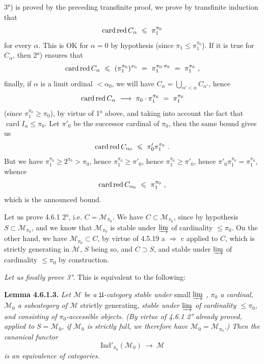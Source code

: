 \documentclass[11pt]{article}
\newcommand{\printedpage}[1]{\marginpar{\footnotesize p.~#1}}
\newcommand{\msp}[1]{\marginpar{\footnotesize [#1]}}
\newcommand{\cardred}{\mathop{\mathrm{card}\,\textup{red}}\nolimits}
\newcommand{\Ind}{\mathrm{Ind}}
\begin{document}
3°) is proved by the preceding transfinite proof, we prove by transfinite induction that
\[
\cardred C_\alpha \ \leqslant\ \pi_1^{\pi_0}
\]
for every $\alpha$. This is OK for $\alpha=0$ by hypothesis (since $\pi_1\leqslant\pi_1^{\pi_0}$). If it is true for $C_\alpha$, then 2°) ensures that
\[
\cardred C_\alpha \ \leqslant\ (\pi_1^{\pi_0})^{\pi_0} \ =\ \pi_1^{\pi_0\cdot\pi_0} \ =\ \pi_1^{\pi_0}\ , %
\]
finally, if $\alpha$ is a limit ordinal $<\alpha_0$, we will have $C_\alpha=\bigcup_{\alpha'<\alpha}C_{\alpha'}$, hence
\[
\cardred C_\alpha \ \longrightarrow\ \pi_0\cdot\pi_1^{\pi_0} \ =\ \pi_1^{\pi_0} %
\]
(since $\pi_1^{\pi_0}\geqslant\pi_0$), by virtue of 1° above, and taking into account the fact that $\operatorname{card}I_\alpha\leqslant\pi_0$. Let $\pi'_0$ be the successor cardinal of $\pi_0$, then the same bound gives us
\[
\cardred C_{\alpha_0} \ \leqslant\ \pi'_0\pi_1^{\pi_0}\ .
\]
\printedpage{46}
But we have $\pi_1^{\pi_0}\geqslant2^{\pi_0}>\pi_0$, hence $\pi_1^{\pi_0}\geqslant\pi'_0$, hence $\pi_1^{\pi_0}\geqslant\pi'_0$, hence $\pi'_0\pi_1^{\pi_0}=\pi_1^{\pi_0}$, whence
\[
\cardred C_{\alpha_0} \ \leqslant\ \pi_1^{\pi_0}\ ,
\]
which is the announced bound.

\msp{page 144}

Let us prove 4.6.1 2°, i.e. $C=\mathcal{M}_{\pi_0}$. We have $C\subset\mathcal{M}_{\pi_0}$, since by hypothesis $S\subset\mathcal{M}_{\pi_0}$, and we know that $\mathcal{M}_{\pi_0}$ is stable under $\varinjlim$ of cardinality $\leqslant\pi_0$. On the other hand, we have $\mathcal{M}_{\pi_0}\subset C$, by virtue of 4.5.19 a $\Longrightarrow$ c applied to $C$, which is strictly generating in $\mathcal{M}$, $S$ being so, and $C\supset S$, and stable under $\varinjlim$ of cardinality $\leqslant\pi_0$ by construction.

\textit{Let us finally prove 3°}. This is equivalent to the following:

\textbf{Lemma 4.6.1.3.} \textit{Let $\mathcal{M}$ be a $\mathfrak{U}$-category stable under} small \textit{$\varinjlim$ , $\pi_0$ a cardinal, $\mathcal{M}_0$ a subcategory of $\mathcal{M}$} strictly generating, \textit{stable under $\varinjlim$ of cardinality $\leqslant\pi_0$, and consisting of $\pi_0$-accessible objects. (By virtue of 4.6.1 2° already proved, applied to $S=\mathcal{M}_0$, if $\mathcal{M}_0$ is strictly full, we therefore have $\mathcal{M}_0=\mathcal{M}_{\pi_0}$.) Then the canonical functor}
\[
\Ind'_{\pi_0}(\mathcal{M}_0) \ \longrightarrow\ \mathcal{M}
\]
\textit{is an equivalence of categories.}
\end{document}
